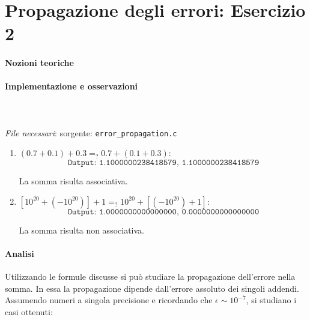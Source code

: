 \section{Propagazione degli errori: Esercizio 2}

\paragraph{Nozioni teoriche}

\paragraph{Implementazione e osservazioni}\mbox{}\\
\\
\textit{File necessari}: sorgente: \texttt{error\_propagation.c}
\\

\begin{enumerate}

	\item $(0.7 + 0.1) + 0.3 =_? 0.7 + (0.1 + 0.3)$:
	      $$\texttt{Output: 1.1000000238418579, 1.1000000238418579}$$

	      La somma risulta associativa.

	\item $[10^{20} + (−10^{20})] + 1 =_? 10^{20} + [(−10^{20}) + 1]$:
	      $$\texttt{Output: 1.0000000000000000, 0.0000000000000000}$$

	      La somma risulta non associativa.
\end{enumerate}

\paragraph{Analisi}

Utilizzando le formule discusse si può studiare la propagazione dell’errore nella somma.
In essa la propagazione dipende dall’errore assoluto dei singoli addendi.
Assumendo numeri a singola precisione e ricordando che $ \epsilon \sim 10^{−7}$,
si studiano i casi ottenuti:

